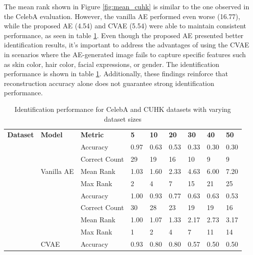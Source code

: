 \documentclass{IEEEcsmag}
\begin{document}
The mean rank shown in Figure \ref{fig:mean_cuhk} is similar to the one observed in the CelebA evaluation. However, the vanilla AE performed even worse (16.77), while the proposed AE (4.54) and CVAE (5.54) were able to maintain consistent performance, as seen in table \ref{tab:identification}. Even though the proposed AE presented better identification results, it's important to address the advantages of using the CVAE in scenarios where the AE-generated image fails to capture specific features such as skin color, hair color, facial expressions, or gender. The identification performance is shown in table \ref{tab:identification}. Additionally, these findings reinforce that reconstruction accuracy alone does not guarantee strong identification performance.

\begin{table}
\vspace*{4pt}
\caption{Identification performance for CelebA and CUHK datasets with varying dataset sizes}
\label{tab:identification}
\tablefont
\begin{tabular*}{\textwidth}{@{}l l l p{30pt}<{\centering} p{30pt}<{\centering} p{30pt}<{\centering} p{30pt}<{\centering} p{30pt}<{\centering} p{30pt}<{\centering}@{}}
\toprule
\textbf{Dataset} & 
\textbf{Model} & 
\textbf{Metric} & 
\textbf{5} & 
\textbf{10} & 
\textbf{20} & 
\textbf{30} & 
\textbf{40} & 
\textbf{50} \\
\colrule
\multirow{15}{*}{CelebA} 
& \multirow{5}{*}{Vanilla AE} & \rule{0pt}{10pt}Accuracy     & 0.97 & 0.63 & 0.53 & 0.33 & 0.30 & 0.30 \\[3pt]
&  & Correct Count & 29   & 19   & 16   & 10   & 9    & 9    \\[3pt]
&  & Mean Rank     & 1.03 & 1.60 & 2.33 & 4.63 & 6.00 & 7.20 \\[3pt]
&  & Max Rank      & 2    & 4    & 7    & 15   & 21   & 25   \\[3pt]
\cline{2-9}
& \multirow{5}{*}{Proposed AE} & \rule{0pt}{10pt}Accuracy     & 1.00 & 0.93 & 0.77 & 0.63 & 0.63 & 0.53 \\[3pt]
&  & Correct Count & 30   & 28   & 23   & 19   & 19   & 16   \\[3pt]
&  & Mean Rank     & 1.00 & 1.07 & 1.33 & 2.17 & 2.73 & 3.17 \\[3pt]
&  & Max Rank      & 1    & 2    & 4    & 7    & 11   & 14   \\[3pt]
\cline{2-9}
& \multirow{5}{*}{CVAE} & \rule{0pt}{10pt}Accuracy     & 0.93 & 0.80 & 0.80 & 0.57 & 0.50 & 0.50 \\[3pt]

\end{tabular*}
\end{table}
\end{document}
